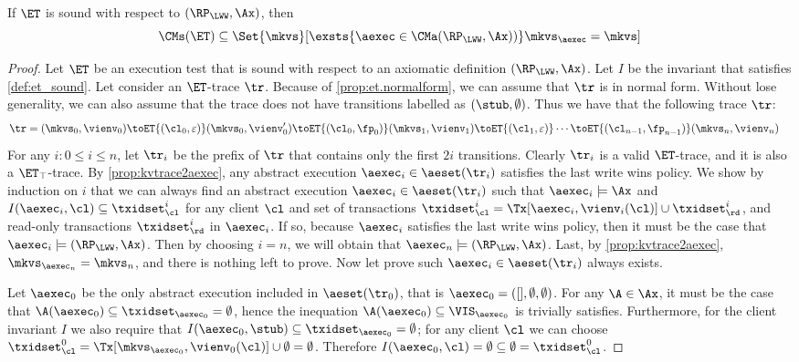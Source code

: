 \begin{theorem}[Soundness]
\label{thm:et_soundness}
If $\ET$ is sound with respect to $(\RP_{\LWW}, \Ax)$, then 
\[
    \CMs(\ET) \subseteq \Set{ \mkvs }[ \exsts{ \aexec \in \CMa(\RP_{\LWW}, \Ax)) }\mkvs_{\aexec} = \mkvs]
\]
\end{theorem}
\begin{proof}
Let $\ET$ be an execution test that is sound with respect to an 
axiomatic definition $(\RP_{\LWW}, \Ax)$. Let $I$ be 
the invariant that satisfies \cref{def:et_sound}. 
Let consider an $\ET$-trace $\tr$.
Because of \cref{prop:et.normalform}, we can assume that $\tr$ is in normal form. 
Without lose generality, we can also assume that the trace does not have transitions labelled as $(\stub, \emptyset)$.
Thus we have that the following trace \( \tr \):
\begin{align*}
\tr & =  (\mkvs_{0}, \vienv_{0}) \toET{(\cl_{0}, \varepsilon)} (\mkvs_{0}, \vienv_{0}') 
\toET{(\cl_{0}, \fp_{0})} 
(\mkvs_1, \vienv_{1}) \toET{(\cl_1, \varepsilon)}  \cdots
\toET{(\cl_{n-1}, \fp_{n-1})} (\mkvs_{n}, \vienv_{n})
\end{align*}
For any $i : 0 \leq i \leq n$, let $\tr_{i}$ be the prefix of $\tr$ that 
contains only the first $2i$ transitions. 
Clearly $\tr_{i}$ is a valid $\ET$-trace, and it is also a $\ET_{\top}$-trace. 
By \cref{prop:kvtrace2aexec}, 
any abstract execution $\aexec_{i} \in \aeset(\tr_{i})$ satisfies the last write wins policy. 
We show by induction on $i$ that we can always find 
an abstract execution $\aexec_{i} \in \aeset(\tr_{i})$ such that $\aexec_i \models \Ax$ and $I(\aexec_{i}, \cl) \subseteq \txidset^{i}_{\cl}$
for any client $\cl$ and set of transactions 
$\txidset^{i}_{\cl} = \Tx[\aexec_{i}, \vienv_{i}(\cl)] \cup \txidset^{i}_\rd$, 
and read-only transactions $\txidset_\rd^{i}$ in $\aexec_{i}$.
If so, because $\aexec_{i}$ satisfies the last write wins policy,
then it must be the case that $\aexec_{i} \models (\RP_{\LWW}, \Ax)$. 
Then by choosing $i = n$, we will obtain that $\aexec_{n} \models (\RP_{\LWW}, \Ax)$. 
Last, by \cref{prop:kvtrace2aexec}, $\mkvs_{\aexec_{n}} = \mkvs_{n}$, and there is nothing left to prove.
Now let prove such $\aexec_{i} \in \aeset(\tr_{i})$ always exists.

Let $\aexec_{0}$ be the only abstract execution included in $\aeset(\tr_{0})$, 
that is $\aexec_{0} = ([], \emptyset, \emptyset)$. 
For any $\A \in \Ax$, it must be the case that 
$\A(\aexec_{0}) \subseteq \txidset_{\aexec_{0}} = \emptyset$, 
hence the inequation $\A(\aexec_{0}) \subseteq \VIS_{\aexec_{0}}$ is trivially satisfies.
Furthermore, for the client invariant $I$ we also require that $I(\aexec_{0}, \stub) \subseteq \txidset_{\aexec_{0}} = \emptyset$; 
for any client $\cl$ we can choose $\txidset_{\cl}^{0} = \Tx[\mkvs_{\aexec_{0}},\vienv_{0}(\cl)] \cup \emptyset = \emptyset$. 
Therefore $I(\aexec_{0}, \cl) = \emptyset \subseteq \emptyset = \txidset_{\cl}^{0}$.


\end{proof}
